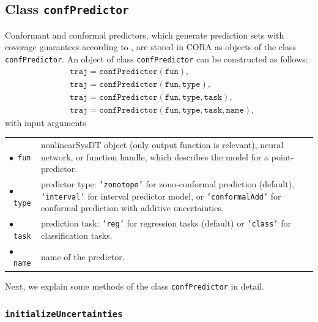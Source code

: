 \subsection{Class \texttt{confPredictor}}
\label{sec:confPredictor}

Conformant and conformal predictors, which generate prediction sets with coverage guarantees according to \cite{Luetzow2025b}, are stored in CORA as objects of the class \texttt{confPredictor}. An object of class \texttt{confPredictor} can be constructed as follows:
\begin{equation*}
	\begin{split}
		& \texttt{traj} = \texttt{confPredictor}(\texttt{fun}), \\
		& \texttt{traj} = \texttt{confPredictor}(\texttt{fun},\texttt{type}), \\
		& \texttt{traj} = \texttt{confPredictor}(\texttt{fun},\texttt{type},\texttt{task}), \\
		& \texttt{traj} = \texttt{confPredictor}(\texttt{fun},\texttt{type},\texttt{task},\texttt{name}), 
	\end{split}
\end{equation*}
with input arguments
\begin{center}
	\renewcommand{\arraystretch}{1.3}
	\begin{tabular}[t]{l p{13cm} }
		$\bullet$~\texttt{fun} & nonlinearSysDT object (only output function is relevant), neural network, or function handle, which describes the model for a point-predictor.\\
		$\bullet$~\texttt{type} & predictor type: \texttt{'zonotope'} for zono-conformal prediction (default), \texttt{'interval'} for interval predictor model, or \texttt{'conformalAdd'} for conformal prediction with additive uncertainties.\\
		$\bullet$~\texttt{task} & prediction task: \texttt{'reg'} for regression tasks (default) or \texttt{'class'} for classification tasks.\\
		$\bullet$~\texttt{name} & name of the predictor. \\
	\end{tabular}
\end{center}

Next, we explain some methods of the class \texttt{confPredictor} in detail.

\subsubsection{\texttt{initializeUncertainties}}

